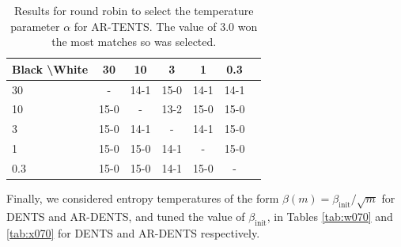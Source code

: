 \documentclass{article}
\theoremstyle{plain}
\begin{document}
\begin{appendices}
            \begin{table}[]
            \centering
                \begin{tabular}{l|cccccc}
                    \textbf{Black \textbackslash White}     & 30  & 10   & 3   & 1    & 0.3    \\ 
                    \hline
                                            30            & -     	&  14-1 		& 15-0  		& 14-1  		& 14-1  		\\
                                            10            &  15-0 		& -     	&  13-2		& 15-0  		&  15-0 		\\
                                            3          &  15-0  	&   14-1 	&   -   &  14-1 		&  15-0 		\\
                                            1          &   	15-0	&  15-0 		&  14-1 		& -     	& 15-0  		\\
                                            0.3         &   15-0		&   	15-0	&   14-1		& 15-0  		&   -   	\\    
                \end{tabular}
                \caption{Results for round robin to select the temperature parameter $\alpha$ for AR-TENTS. The value of 3.0 won the most matches so was selected. \label{tab:x060}}
            \end{table}
            
            
            
            
            
            
            
            
            
            
            Finally, we considered entropy temperatures of the form $\beta(m)=\beta_{\text{init}}/\sqrt{m}$ for DENTS and AR-DENTS, and tuned the value of $\beta_{\text{init}}$, in Tables \ref{tab:w070} and \ref{tab:x070} for DENTS and AR-DENTS respectively.
            

\end{appendices}
\end{document}
